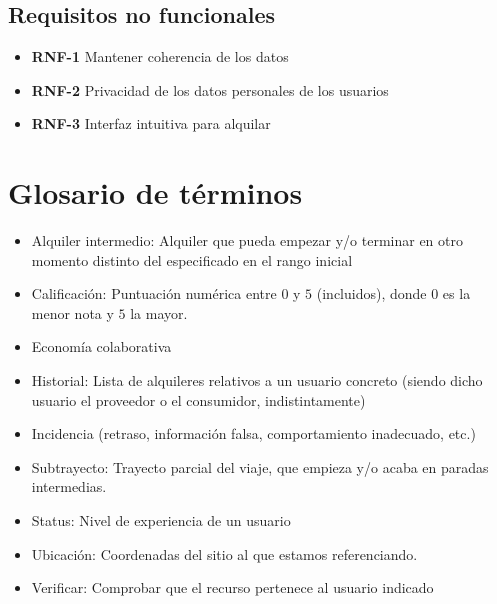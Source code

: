 \documentclass[11pt,spanish]{article} %
\begin{document}
\subsection{Requisitos no funcionales}
\begin{itemize}
	\item \textbf{RNF-1} Mantener coherencia de los datos
	\item \textbf{RNF-2} Privacidad de los datos personales de los usuarios
	\item \textbf{RNF-3} Interfaz intuitiva para alquilar	
\end{itemize}

\section{Glosario de términos}
\begin{itemize}
	\item Alquiler intermedio: Alquiler que pueda empezar y/o terminar en otro momento distinto del especificado en el rango inicial
	\item Calificación: Puntuación numérica entre $0$ y $5$ (incluidos), donde $0$ es la menor nota y $5$ la mayor.
	\item Economía colaborativa
	\item Historial: Lista de alquileres relativos a un usuario concreto (siendo dicho usuario el proveedor o el consumidor, indistintamente)
	\item Incidencia (retraso, información falsa, comportamiento inadecuado, etc.)
	\item Subtrayecto: Trayecto parcial del viaje, que empieza y/o acaba en paradas intermedias.
	\item Status: Nivel de experiencia de un usuario
	\item Ubicación: Coordenadas del sitio al que estamos referenciando.
	\item Verificar: Comprobar que el recurso pertenece al usuario indicado	
\end{itemize}







  

  
\end{document}
